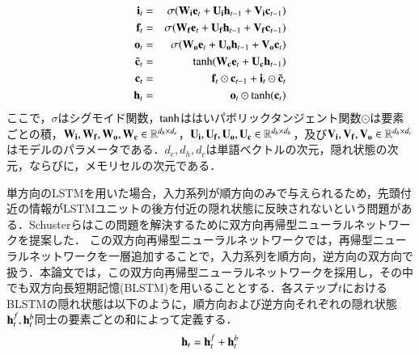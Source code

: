 \documentclass[dvipdfmx,twocolumn,10.5pt]{jsarticle}
\begin{document}
\begin{eqnarray}
{\bf i}_t&=&\sigma ({\bf W}_{\bf i} {\bf e}_t + {\bf U}_{\bf i}{\bf h}_{t-1} + {\bf V}_{\bf i}{\bf c}_{t-1}) \\
{\bf f}_t&=&\sigma ({\bf W}_{\bf f} {\bf e}_t + {\bf U}_{\bf f}{\bf h}_{t-1} + {\bf V}_{\bf f}{\bf c}_{t-1}) \\
{\bf o}_t&=& \sigma ({\bf W}_{\bf o} {\bf e}_t + {\bf U}_{\bf o}{\bf h}_{t-1} + {\bf V}_{\bf o}{\bf c}_{t}) \\
\tilde{{\bf c}}_t &=& {\rm tanh}({\bf W}_{\bf c} {\bf e}_t + {\bf U}_{\bf c}{\bf h}_{t-1}) \\
{\bf c}_t &=& {\bf f}_t \odot {\bf c}_{t-1} + {\bf i}_t \odot \tilde{{\bf c}}_t \\
{\bf h}_t &=& {\bf o}_t \odot {\rm tanh}({\bf c}_t) 
\end{eqnarray}
ここで，$\sigma$はシグモイド関数，${\rm tanh}$ははいパボリックタンジェント関数$\odot$は要素ごとの積，${\bf W}_{\bf i}, {\bf W}_{\bf f}, {\bf W}_{\bf o}, {\bf W}_{\bf c} \in \mathbb{R}^{d_h\times d_e} $，${\bf U}_{\bf i}, {\bf U}_{\bf f}, {\bf U}_{\bf o}, {\bf U}_{\bf c} \in \mathbb{R}^{d_h\times d_h} $，及び${\bf V}_{\bf i}, {\bf V}_{\bf f}, {\bf V}_{\bf o} \in \mathbb{R}^{d_h\times d_c} $ はモデルのパラメータである．$d_e, d_h, d_c$は単語ベクトルの次元，隠れ状態の次元，ならびに，メモリセルの次元である．

単方向のLSTMを用いた場合，入力系列が順方向のみで与えられるため，先頭付近の情報がLSTMユニットの後方付近の隠れ状態に反映されないという問題がある．Schusterらはこの問題を解決するために双方向再帰型ニューラルネットワークを提案した．\cite{schuster1997bidirectional}
この双方向再帰型ニューラルネットワークでは，再帰型ニューラルネットワークを一層追加することで，入力系列を順方向，逆方向の双方向で扱う．本論文では，この双方向再帰型ニューラルネットワークを採用し，その中でも双方向長短期記憶(BLSTM)を用いることとする．各ステップ$t$におけるBLSTMの隠れ状態は以下のように，順方向および逆方向それぞれの隠れ状態${\bf h}_t^f, {\bf h}_t^b$同士の要素ごとの和によって定義する．
\begin{equation}
  {\bf h}_t = {\bf h}_t^f +  {\bf h}_t^b
\end{equation}
\end{document}
